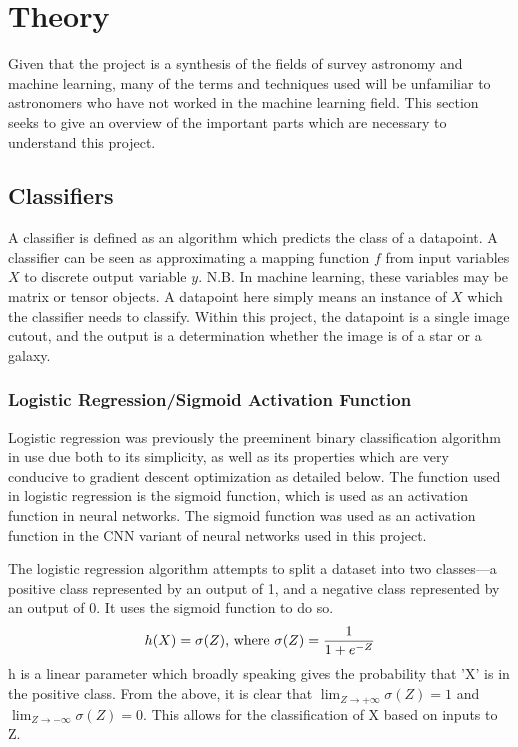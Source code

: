 \documentclass[a4paper,fleqn,usenatbib]{mnras}
\begin{document}
\section{Theory}

Given that the project is a synthesis of the fields of survey astronomy and machine learning, many of the terms and techniques used will be unfamiliar to astronomers who have not worked in the machine learning field. This section seeks to give an overview of the important parts which are necessary to understand this project. 
\subsection{Classifiers}
\label{sec:classifier}
A classifier is defined as an algorithm which predicts the class of a datapoint. A classifier can be seen as approximating a mapping function $f$ from input variables $X$ to discrete output variable $y$. N.B. In machine learning, these variables may be matrix or tensor objects. A datapoint here simply means an instance of $X$ which the classifier needs to classify.  Within this project, the datapoint is a single image cutout, and the output is a determination whether the image is of a star or a galaxy. 


\subsubsection{Logistic Regression/Sigmoid Activation Function}
\label{sec:Logistic}
Logistic regression was previously the preeminent binary classification algorithm in use due both to its simplicity, as well as its properties which are very conducive to gradient descent optimization as detailed below. The function used in logistic regression is the sigmoid function, which is used as an activation function in neural networks. The sigmoid function was used as an activation function in the CNN variant of neural networks used in this project. \citep{LogisticRegression}

The logistic regression algorithm attempts to split a dataset into two classes---a positive class represented by an output of 1, and a negative class represented by an output of 0. It uses the sigmoid function to do so.
\begin{equation}
h(X)=\sigma(Z) \textnormal{, where } \sigma(Z)=\frac{1}{1+e^{-Z}}
\end{equation}
h is a linear parameter which broadly speaking gives the probability that 'X' is in the positive class. 
From the above, it is clear that $\lim_{Z \to +\infty} \sigma(Z)=1$ and $\lim_{Z \to -\infty} \sigma(Z)=0$. This allows for the classification of X based on inputs to Z. 
\end{document}
